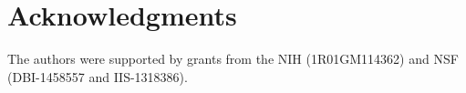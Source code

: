 \section*{Acknowledgments}
The authors were supported by grants from the NIH (1R01GM114362) and
NSF (DBI-1458557 and IIS-1318386).
